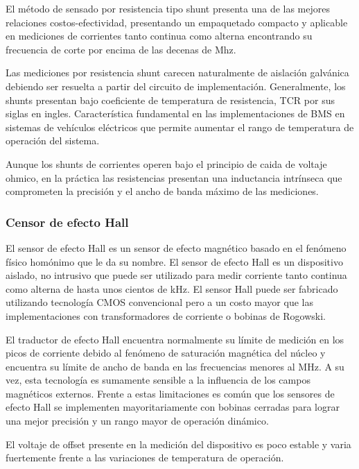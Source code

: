 \documentclass[10pt,a4paper]{article}
\begin{document}
El método de sensado por resistencia tipo shunt presenta una de las mejores relaciones costos-efectividad, presentando un empaquetado compacto y aplicable en mediciones de corrientes tanto continua como alterna encontrando su frecuencia de corte por encima de las decenas de Mhz.

Las mediciones por resistencia shunt carecen naturalmente de aislación galvánica debiendo ser resuelta a partir del circuito de implementación. Generalmente, los shunts presentan bajo coeficiente de temperatura de resistencia, TCR por sus siglas en ingles. Característica fundamental en las implementaciones de BMS en sistemas de vehículos eléctricos que permite aumentar el rango de temperatura de operación del sistema.

Aunque los shunts de corrientes operen bajo el principio de caida de voltaje ohmico, en la práctica las resistencias presentan una inductancia intrínseca que comprometen la precisión y el ancho de banda máximo de las mediciones.

\subsubsection{Censor de efecto Hall}
El sensor de efecto Hall es un sensor de efecto magnético basado en el fenómeno físico homónimo que le da su nombre. 
El sensor de efecto Hall es un dispositivo aislado, no intrusivo que puede ser utilizado para medir corriente tanto continua como alterna de hasta unos cientos de kHz. El sensor Hall puede ser fabricado utilizando tecnología CMOS convencional pero a un costo mayor que las implementaciones con transformadores de corriente o bobinas de Rogowski.

El traductor de efecto Hall encuentra normalmente su límite de medición en los picos de corriente debido al fenómeno de saturación magnética del núcleo y encuentra su límite de ancho de banda en las frecuencias menores al MHz. A su vez, esta tecnología es sumamente sensible a la influencia de los campos magnéticos externos. Frente a estas limitaciones es común que los sensores de efecto Hall se implementen mayoritariamente con bobinas cerradas para lograr una mejor precisión y un rango mayor de operación dinámico.

El voltaje de offset presente en la medición del dispositivo es poco estable y varia fuertemente frente a las variaciones de temperatura de operación.
\end{document}
